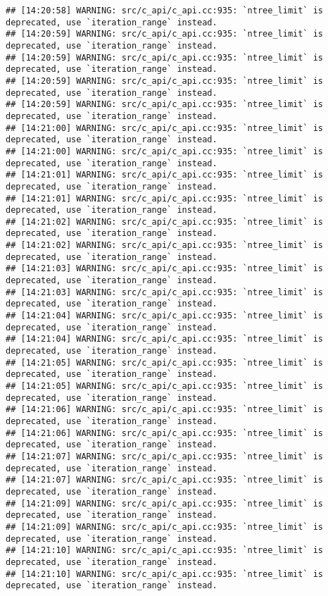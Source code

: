 \documentclass[
]{article}
\begin{document}
\begin{verbatim}
## [14:20:58] WARNING: src/c_api/c_api.cc:935: `ntree_limit` is deprecated, use `iteration_range` instead.
## [14:20:59] WARNING: src/c_api/c_api.cc:935: `ntree_limit` is deprecated, use `iteration_range` instead.
## [14:20:59] WARNING: src/c_api/c_api.cc:935: `ntree_limit` is deprecated, use `iteration_range` instead.
## [14:20:59] WARNING: src/c_api/c_api.cc:935: `ntree_limit` is deprecated, use `iteration_range` instead.
## [14:20:59] WARNING: src/c_api/c_api.cc:935: `ntree_limit` is deprecated, use `iteration_range` instead.
## [14:21:00] WARNING: src/c_api/c_api.cc:935: `ntree_limit` is deprecated, use `iteration_range` instead.
## [14:21:00] WARNING: src/c_api/c_api.cc:935: `ntree_limit` is deprecated, use `iteration_range` instead.
## [14:21:01] WARNING: src/c_api/c_api.cc:935: `ntree_limit` is deprecated, use `iteration_range` instead.
## [14:21:01] WARNING: src/c_api/c_api.cc:935: `ntree_limit` is deprecated, use `iteration_range` instead.
## [14:21:02] WARNING: src/c_api/c_api.cc:935: `ntree_limit` is deprecated, use `iteration_range` instead.
## [14:21:02] WARNING: src/c_api/c_api.cc:935: `ntree_limit` is deprecated, use `iteration_range` instead.
## [14:21:03] WARNING: src/c_api/c_api.cc:935: `ntree_limit` is deprecated, use `iteration_range` instead.
## [14:21:03] WARNING: src/c_api/c_api.cc:935: `ntree_limit` is deprecated, use `iteration_range` instead.
## [14:21:04] WARNING: src/c_api/c_api.cc:935: `ntree_limit` is deprecated, use `iteration_range` instead.
## [14:21:04] WARNING: src/c_api/c_api.cc:935: `ntree_limit` is deprecated, use `iteration_range` instead.
## [14:21:05] WARNING: src/c_api/c_api.cc:935: `ntree_limit` is deprecated, use `iteration_range` instead.
## [14:21:05] WARNING: src/c_api/c_api.cc:935: `ntree_limit` is deprecated, use `iteration_range` instead.
## [14:21:06] WARNING: src/c_api/c_api.cc:935: `ntree_limit` is deprecated, use `iteration_range` instead.
## [14:21:06] WARNING: src/c_api/c_api.cc:935: `ntree_limit` is deprecated, use `iteration_range` instead.
## [14:21:07] WARNING: src/c_api/c_api.cc:935: `ntree_limit` is deprecated, use `iteration_range` instead.
## [14:21:07] WARNING: src/c_api/c_api.cc:935: `ntree_limit` is deprecated, use `iteration_range` instead.
## [14:21:09] WARNING: src/c_api/c_api.cc:935: `ntree_limit` is deprecated, use `iteration_range` instead.
## [14:21:09] WARNING: src/c_api/c_api.cc:935: `ntree_limit` is deprecated, use `iteration_range` instead.
## [14:21:10] WARNING: src/c_api/c_api.cc:935: `ntree_limit` is deprecated, use `iteration_range` instead.
## [14:21:10] WARNING: src/c_api/c_api.cc:935: `ntree_limit` is deprecated, use `iteration_range` instead.

\end{verbatim}
\end{document}
